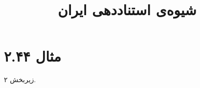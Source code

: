\documentclass[a4paper,10pt]{article}
\begin{document}
\title{شیوه‌ی استناددهی ایران}
\author{}
\date{}
\maketitle



\section*{مثال ۲.۴۴}

زیربخش ۲.\\
\cite{بوسکالیا1978}\\
\cite{خوشدل1379}\\
\\
\\






\end{document}
